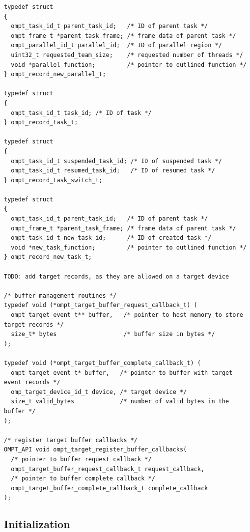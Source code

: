 \documentclass{article}
\begin{document}
{\begin{verbatim}
typedef struct
{
  ompt_task_id_t parent_task_id;   /* ID of parent task */
  ompt_frame_t *parent_task_frame; /* frame data of parent task */
  ompt_parallel_id_t parallel_id;  /* ID of parallel region */
  uint32_t requested_team_size;    /* requested number of threads */
  void *parallel_function;         /* pointer to outlined function */
} ompt_record_new_parallel_t;

typedef struct
{
  ompt_task_id_t task_id; /* ID of task */
} ompt_record_task_t;

typedef struct
{
  ompt_task_id_t suspended_task_id; /* ID of suspended task */
  ompt_task_id_t resumed_task_id;   /* ID of resumed task */
} ompt_record_task_switch_t;

typedef struct
{
  ompt_task_id_t parent_task_id;   /* ID of parent task */
  ompt_frame_t *parent_task_frame; /* frame data of parent task */
  ompt_task_id_t new_task_id;      /* ID of created task */
  void *new_task_function;         /* pointer to outlined function */
} ompt_record_new_task_t;

TODO: add target records, as they are allowed on a target device

/* buffer management routines */
typedef void (*ompt_target_buffer_request_callback_t) (
  ompt_target_event_t** buffer,   /* pointer to host memory to store target records */
  size_t* bytes                   /* buffer size in bytes */
);
  
typedef void (*ompt_target_buffer_complete_callback_t) (
  ompt_target_event_t* buffer,   /* pointer to buffer with target event records */
  omp_target_device_id_t device, /* target device */
  size_t valid_bytes             /* number of valid bytes in the buffer */
);

/* register target buffer callbacks */
OMPT_API void ompt_target_register_buffer_callbacks(
  /* pointer to buffer request callback */
  ompt_target_buffer_request_callback_t request_callback,
  /* pointer to buffer complete callback */
  ompt_target_buffer_complete_callback_t complete_callback 
);
\end{verbatim}

\clearpage
\subsection{Initialization} 
\label{sec:app:init}

}
\end{document}
